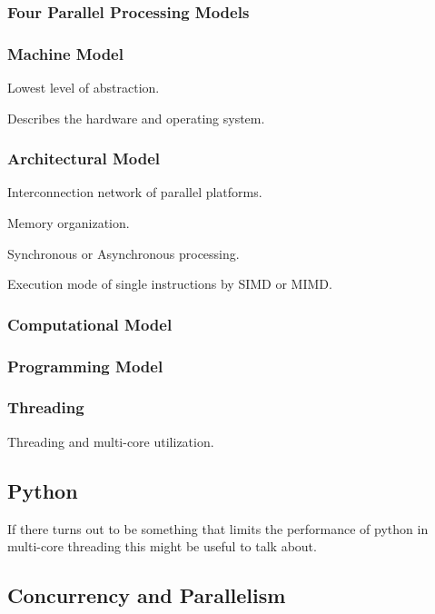 \documentclass{article}
\begin{document}
\subsubsection{Four Parallel Processing Models}

\subsubsection{Machine Model}

Lowest level of abstraction.

Describes the hardware and operating system.

\subsubsection{Architectural Model}

Interconnection network of parallel platforms.

Memory organization.

Synchronous or Asynchronous processing.

Execution mode of single instructions by SIMD or MIMD.

\subsubsection{Computational Model}

\subsubsection{Programming Model}

\subsubsection{Threading}

Threading and multi-core utilization.

\subsection{Python}

If there turns out to be something that limits the performance of python in multi-core threading this might be useful to talk about.

\subsection{Concurrency and Parallelism}
\end{document}
